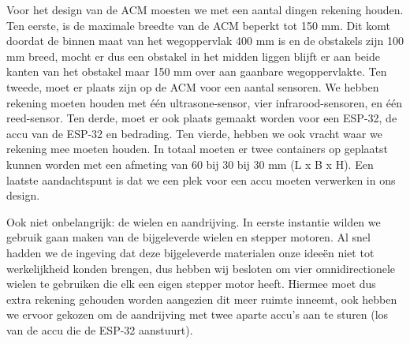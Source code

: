 Voor het design van de ACM moesten we met een aantal dingen rekening houden. Ten eerste, is de maximale breedte van de ACM beperkt tot 150 mm. Dit komt doordat de binnen maat van het wegoppervlak 400 mm is en de obstakels zijn 100 mm breed, mocht er dus een obstakel in het midden liggen blijft er aan beide kanten van het obstakel maar 150 mm over aan gaanbare wegoppervlakte. Ten tweede, moet er plaats zijn op de ACM voor een aantal sensoren. We hebben rekening moeten houden met één ultrasone-sensor, vier infrarood-sensoren, en één reed-sensor. Ten derde, moet er ook plaats gemaakt worden voor een ESP-32, de accu van de ESP-32 en bedrading. Ten vierde, hebben we ook vracht waar we rekening mee moeten houden. In totaal moeten er twee containers op geplaatst kunnen worden met een afmeting van 60 bij 30 bij 30 mm (L x B x H). Een laatste aandachtspunt is dat we een plek voor een accu moeten verwerken in ons design.

Ook niet onbelangrijk: de wielen en aandrijving. In eerste instantie wilden we gebruik gaan maken van de bijgeleverde wielen en stepper motoren. Al snel hadden we de ingeving dat deze bijgeleverde materialen onze ideeën niet tot werkelijkheid konden brengen, dus hebben wij besloten om vier omnidirectionele wielen te gebruiken die elk een eigen stepper motor heeft. Hiermee moet dus extra rekening gehouden worden aangezien dit meer ruimte inneemt, ook hebben we ervoor gekozen om de aandrijving met twee aparte accu’s aan te sturen (los van de accu die de ESP-32 aanstuurt).